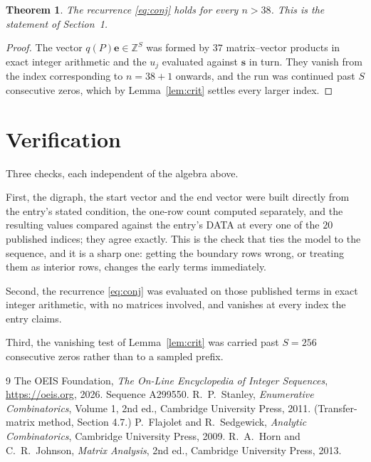 \documentclass[11pt,a4paper]{article}
\theoremstyle{plain}
\newtheorem{theorem}{Theorem}
\theoremstyle{definition}
\begin{document}
\begin{theorem}
The recurrence \eqref{eq:conj} holds for every $n>38$. This is the statement of
Section~1.
\end{theorem}

\begin{proof}
The vector $q(P)\mathbf{e}\in\mathbb{Z}^{S}$ was formed by $37$ matrix--vector
products in exact integer arithmetic and the $u_j$ evaluated against $\mathbf{s}$ in turn.
They vanish from the index corresponding to $n=38+1$ onwards, and the run was continued
past $S$ consecutive zeros, which by Lemma~\ref{lem:crit} settles every larger index.
\end{proof}

\section{Verification}

Three checks, each independent of the algebra above.

First, the digraph, the start vector and the end vector were built directly from the
entry's stated condition, the one-row count computed separately, and the resulting values
compared against the entry's DATA at every one of the $20$ published indices; they
agree exactly. This is the check that ties the model to the sequence, and it is a sharp one:
getting the boundary rows wrong, or treating them as interior rows, changes the early terms
immediately.

Second, the recurrence \eqref{eq:conj} was evaluated on those published terms in exact
integer arithmetic, with no matrices involved, and vanishes at every index the entry claims.

Third, the vanishing test of Lemma~\ref{lem:crit} was carried past $S=256$ consecutive
zeros rather than to a sampled prefix.

\begin{thebibliography}{9}
 The OEIS Foundation, \emph{The On-Line Encyclopedia of Integer
Sequences}, \url{https://oeis.org}, 2026. Sequence A299550.
 R.~P.~Stanley, \emph{Enumerative Combinatorics}, Volume 1, 2nd ed.,
Cambridge University Press, 2011. (Transfer-matrix method, Section 4.7.)
 P.~Flajolet and R.~Sedgewick, \emph{Analytic Combinatorics}, Cambridge
University Press, 2009.
 R.~A.~Horn and C.~R.~Johnson, \emph{Matrix Analysis}, 2nd ed., Cambridge
University Press, 2013.
\end{thebibliography}
\end{document}
